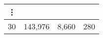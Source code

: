 \begin{table}[htbp]
\begin{center}
\begin{tabular}{rrrr}
      \vdots & & & \\ \hline
      30 & 143,976 & 8,660 & 280 \\ \hline
    \end{tabular}
  \end{center}
\end{table}
